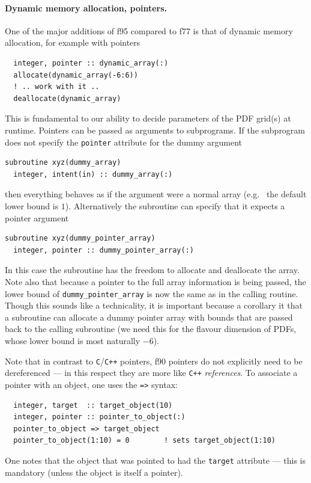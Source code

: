 \documentclass[12pt]{article}
\newcommand{\eg}{e.g.\ }
\newcommand{\ttt}[1]{\texttt{#1}}
\begin{document}
\paragraph{Dynamic memory allocation, pointers.} One of the major
additions of f95 compared to f77 is that of dynamic memory allocation,
for example with pointers
\begin{verbatim}
  integer, pointer :: dynamic_array(:)
  allocate(dynamic_array(-6:6))
  ! .. work with it ..
  deallocate(dynamic_array)
\end{verbatim}
This is fundamental to our ability to decide parameters of the PDF
grid(s) at runtime. Pointers can be passed as arguments to subprograms.
If the subprogram does not specify the \texttt{pointer} attribute for
the dummy argument
\begin{verbatim}
subroutine xyz(dummy_array)
  integer, intent(in) :: dummy_array(:)
\end{verbatim}
then everything behaves as if the argument were a normal array (\eg
the default lower bound is $1$). Alternatively the subroutine can
specify that it expects a pointer argument
\begin{verbatim}
subroutine xyz(dummy_pointer_array)
  integer, pointer :: dummy_pointer_array(:)
\end{verbatim}
In this case the subroutine has the freedom to allocate and deallocate
the array. Note also that because a pointer to the full array
information is being passed, the lower bound of \texttt{dummy\_pointer\_array}
is now the same as in the calling routine. Though this sounds like a
technicality, it is important because a corollary it that a subroutine
can allocate a dummy pointer array with bounds that are passed back to
the calling subroutine (we need this for the flavour dimension of
PDFs, whose lower bound is most naturally $-6$). 

Note that in contrast to \ttt{C}/\ttt{C++} pointers, f90 pointers do
not explicitly need to be dereferenced --- in this respect they are
more like \ttt{C++} \emph{references}. To associate a pointer with an
object, one uses the \ttt{=>} syntax:
\begin{verbatim}
  integer, target  :: target_object(10)
  integer, pointer :: pointer_to_object(:)
  pointer_to_object => target_object
  pointer_to_object(1:10) = 0        ! sets target_object(1:10)
\end{verbatim}
One notes that the object that was pointed to had the \ttt{target}
attribute --- this is mandatory (unless the object is itself a
pointer).
\end{document}
